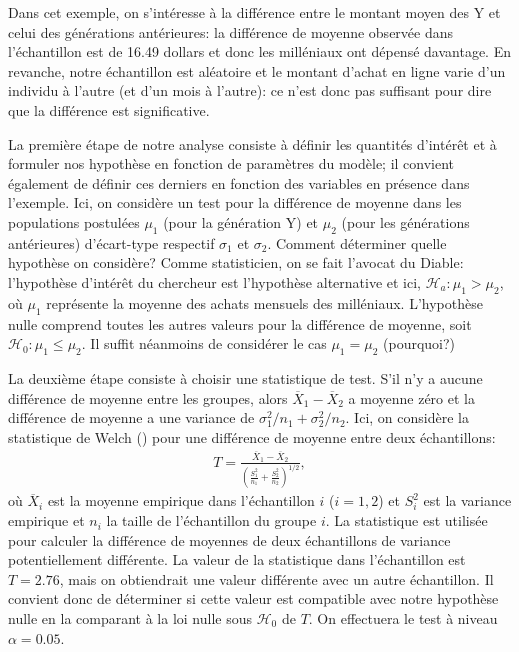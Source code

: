 \documentclass[
  11pt,
  letterpaper,
]{scrbook}
\theoremstyle{definition}
\theoremstyle{definition}
\theoremstyle{remark}
\begin{document}
Dans cet exemple, on s'intéresse à la différence entre le montant moyen
des Y et celui des générations antérieures: la différence de moyenne
observée dans l'échantillon est de 16.49 dollars et donc les milléniaux
ont dépensé davantage. En revanche, notre échantillon est aléatoire et
le montant d'achat en ligne varie d'un individu à l'autre (et d'un mois
à l'autre): ce n'est donc pas suffisant pour dire que la différence est
significative.

La première étape de notre analyse consiste à définir les quantités
d'intérêt et à formuler nos hypothèse en fonction de paramètres du
modèle; il convient également de définir ces derniers en fonction des
variables en présence dans l'exemple. Ici, on considère un test pour la
différence de moyenne dans les populations postulées \(\mu_1\) (pour la
génération Y) et \(\mu_2\) (pour les générations antérieures)
d'écart-type respectif \(\sigma_1\) et \(\sigma_2\). Comment déterminer
quelle hypothèse on considère? Comme statisticien, on se fait l'avocat
du Diable: l'hypothèse d'intérêt du chercheur est l'hypothèse
alternative et ici, \(\mathscr{H}_a: \mu_1 > \mu_2\), où \(\mu_1\)
représente la moyenne des achats mensuels des milléniaux. L'hypothèse
nulle comprend toutes les autres valeurs pour la différence de moyenne,
soit \(\mathscr{H}_0: \mu_1 \leq \mu_2\). Il suffit néanmoins de
considérer le cas \(\mu_1=\mu_2\) (pourquoi?)

La deuxième étape consiste à choisir une statistique de test. S'il n'y a
aucune différence de moyenne entre les groupes, alors
\(\overline{X}_1-\overline{X}_2\) a moyenne zéro et la différence de
moyenne a une variance de \(\sigma^2_1/n_1+\sigma^2_2/n_2\). Ici, on
considère la statistique de Welch () pour
une différence de moyenne entre deux échantillons: \begin{align*}
T = \frac{\overline{X}_1 - \overline{X}_2}{\left(\frac{S_1^2}{n_1}+\frac{S_2^2}{n_2} \right)^{1/2}}, \end{align*}
où \(\overline{X}_i\) est la moyenne empirique dans l'échantillon \(i\)
(\(i=1, 2\)) et \(S_i^2\) est la variance empirique et \(n_i\) la taille
de l'échantillon du groupe \(i\). La statistique est utilisée pour
calculer la différence de moyennes de deux échantillons de variance
potentiellement différente. La valeur de la statistique dans
l'échantillon est \(T=2.76\), mais on obtiendrait une valeur différente
avec un autre échantillon. Il convient donc de déterminer si cette
valeur est compatible avec notre hypothèse nulle en la comparant à la
loi nulle sous \(\mathscr{H}_0\) de \(T\). On effectuera le test à
niveau \(\alpha=0.05\).
\end{document}
